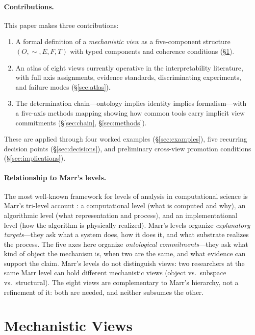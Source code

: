 \documentclass[11pt]{article}
\theoremstyle{remark}
\begin{document}
\paragraph{Contributions.}
This paper makes three contributions:
\begin{enumerate}[leftmargin=*]
\item A formal definition of a \emph{mechanistic view} as a five-component
      structure $(O, {\sim}, E, F, T)$ with typed components and coherence
      conditions (\S\ref{sec:views}).
\item An atlas of eight views currently operative in the
      interpretability literature, with full axis assignments, evidence
      standards, discriminating experiments, and failure modes
      (\S\ref{sec:atlas}).
\item The determination chain---ontology implies identity implies
      formalism---with a five-axis methods mapping showing how common
      tools carry implicit view commitments
      (\S\ref{sec:chain}, \S\ref{sec:methods}).
\end{enumerate}
These are applied through four worked examples (\S\ref{sec:examples}),
five recurring decision points (\S\ref{sec:decisions}), and preliminary
cross-view promotion conditions (\S\ref{sec:implications}).

\paragraph{Relationship to Marr's levels.}
The most well-known framework for levels of analysis in computational
science is Marr's tri-level account \citep{marr1982}: a computational
level (what is computed and why), an algorithmic level (what
representation and process), and an implementational level (how the
algorithm is physically realized).  Marr's levels organize
\emph{explanatory targets}---they ask what a system does, how it does
it, and what substrate realizes the process.  The five axes here
organize \emph{ontological commitments}---they ask what kind of object
the mechanism is, when two are the same, and what evidence can support
the claim.  Marr's levels do not distinguish views: two researchers
at the same Marr level can hold different mechanistic views (object vs.\
subspace vs.\ structural).  The eight views are complementary to Marr's
hierarchy, not a refinement of it: both are needed, and neither
subsumes the other.


\section{Mechanistic Views}\label{sec:views}
\end{document}

